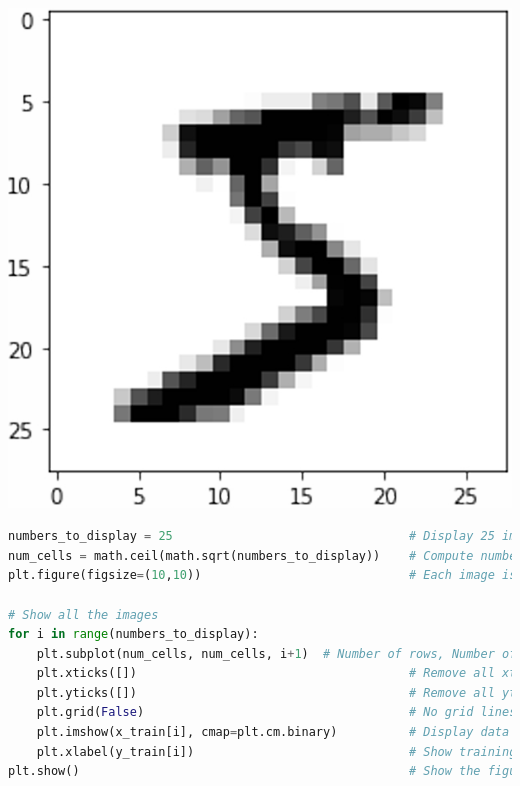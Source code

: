 \documentclass{book}
\begin{document}
\begin{center}
    \includegraphics[scale=0.15]{chapter 7/ch7_figure14.jpeg}
\end{center}
\begin{lstlisting}[language=Python, basicstyle=\ttfamily\small, keywordstyle=\color{blue}, commentstyle=\color{forestgreen}, stringstyle=\color{red}, showstringspaces=false]
numbers_to_display = 25                                 # Display 25 images
num_cells = math.ceil(math.sqrt(numbers_to_display))    # Compute number of images per row
plt.figure(figsize=(10,10))                             # Each image is in 10x10 pixels

# Show all the images
for i in range(numbers_to_display):
    plt.subplot(num_cells, num_cells, i+1)  # Number of rows, Number of columns & Index (Start from 1)
    plt.xticks([])                                      # Remove all xticks
    plt.yticks([])                                      # Remove all yticks
    plt.grid(False)                                     # No grid lines
    plt.imshow(x_train[i], cmap=plt.cm.binary)          # Display data as a binary image
    plt.xlabel(y_train[i])                              # Show training image labels
plt.show()                                              # Show the figure
\end{lstlisting}
\end{document}
